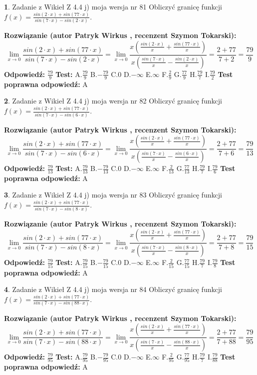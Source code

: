 \documentclass[12pt, a4paper]{article}
\theoremstyle{definition} %
\newtheorem{zad}{}
\newcommand{\zadStart}[1]{\begin{zad}#1\newline}
\newcommand{\zadStop}{\end{zad}}
\newcommand{\rozwStart}[2]{\noindent \textbf{Rozwiązanie (autor #1 , recenzent #2): }\newline}
\newcommand{\rozwStop}{\newline}
\newcommand{\odpStart}{\noindent \textbf{Odpowiedź:}\newline}
\newcommand{\odpStop}{\newline}
\newcommand{\testStart}{\noindent \textbf{Test:}\newline}
\newcommand{\testStop}{\newline}
\newcommand{\kluczStart}{\noindent \textbf{Test poprawna odpowiedź:}\newline}
\newcommand{\kluczStop}{\newline}
\begin{document}
\zadStart{Zadanie z Wikieł Z 4.4 j) moja wersja nr 81}
Obliczyć granicę funkcji $f(x)=\frac{sin(2\cdot x) +sin(77\cdot x)}{sin(7\cdot x) -sin(2\cdot x)}$.
\zadStop
\rozwStart{Patryk Wirkus}{Szymon Tokarski}
$$\lim\limits_{x\to 0}\frac{sin(2\cdot x) +sin(77\cdot x)}{sin(7\cdot x) -sin(2\cdot x)}=\lim\limits_{x\to 0}\frac{x(\frac{sin(2\cdot x)}{x}+\frac{sin(77\cdot x)}{x})}{x(\frac{sin(7\cdot x)}{x}-\frac{sin(2\cdot x)}{x})}=\frac{2+77}{7+2} = \frac{79}{9}$$
\rozwStop
\odpStart
$\frac{79}{9}$
\odpStop
\testStart
A.$\frac{79}{9}$
B.$-\frac{79}{9}$
C.$0$
D.$-\infty$
E.$\infty$
F.$\frac{2}{9}$
G.$\frac{77}{9}$
H.$\frac{79}{7}$
I.$\frac{79}{2}$
\testStop
\kluczStart
A
\kluczStop



\zadStart{Zadanie z Wikieł Z 4.4 j) moja wersja nr 82}
Obliczyć granicę funkcji $f(x)=\frac{sin(2\cdot x) +sin(77\cdot x)}{sin(7\cdot x) -sin(6\cdot x)}$.
\zadStop
\rozwStart{Patryk Wirkus}{Szymon Tokarski}
$$\lim\limits_{x\to 0}\frac{sin(2\cdot x) +sin(77\cdot x)}{sin(7\cdot x) -sin(6\cdot x)}=\lim\limits_{x\to 0}\frac{x(\frac{sin(2\cdot x)}{x}+\frac{sin(77\cdot x)}{x})}{x(\frac{sin(7\cdot x)}{x}-\frac{sin(6\cdot x)}{x})}=\frac{2+77}{7+6} = \frac{79}{13}$$
\rozwStop
\odpStart
$\frac{79}{13}$
\odpStop
\testStart
A.$\frac{79}{13}$
B.$-\frac{79}{13}$
C.$0$
D.$-\infty$
E.$\infty$
F.$\frac{2}{13}$
G.$\frac{77}{13}$
H.$\frac{79}{7}$
I.$\frac{79}{6}$
\testStop
\kluczStart
A
\kluczStop



\zadStart{Zadanie z Wikieł Z 4.4 j) moja wersja nr 83}
Obliczyć granicę funkcji $f(x)=\frac{sin(2\cdot x) +sin(77\cdot x)}{sin(7\cdot x) -sin(8\cdot x)}$.
\zadStop
\rozwStart{Patryk Wirkus}{Szymon Tokarski}
$$\lim\limits_{x\to 0}\frac{sin(2\cdot x) +sin(77\cdot x)}{sin(7\cdot x) -sin(8\cdot x)}=\lim\limits_{x\to 0}\frac{x(\frac{sin(2\cdot x)}{x}+\frac{sin(77\cdot x)}{x})}{x(\frac{sin(7\cdot x)}{x}-\frac{sin(8\cdot x)}{x})}=\frac{2+77}{7+8} = \frac{79}{15}$$
\rozwStop
\odpStart
$\frac{79}{15}$
\odpStop
\testStart
A.$\frac{79}{15}$
B.$-\frac{79}{15}$
C.$0$
D.$-\infty$
E.$\infty$
F.$\frac{2}{15}$
G.$\frac{77}{15}$
H.$\frac{79}{7}$
I.$\frac{79}{8}$
\testStop
\kluczStart
A
\kluczStop



\zadStart{Zadanie z Wikieł Z 4.4 j) moja wersja nr 84}
Obliczyć granicę funkcji $f(x)=\frac{sin(2\cdot x) +sin(77\cdot x)}{sin(7\cdot x) -sin(88\cdot x)}$.
\zadStop
\rozwStart{Patryk Wirkus}{Szymon Tokarski}
$$\lim\limits_{x\to 0}\frac{sin(2\cdot x) +sin(77\cdot x)}{sin(7\cdot x) -sin(88\cdot x)}=\lim\limits_{x\to 0}\frac{x(\frac{sin(2\cdot x)}{x}+\frac{sin(77\cdot x)}{x})}{x(\frac{sin(7\cdot x)}{x}-\frac{sin(88\cdot x)}{x})}=\frac{2+77}{7+88} = \frac{79}{95}$$
\rozwStop
\odpStart
$\frac{79}{95}$
\odpStop
\testStart
A.$\frac{79}{95}$
B.$-\frac{79}{95}$
C.$0$
D.$-\infty$
E.$\infty$
F.$\frac{2}{95}$
G.$\frac{77}{95}$
H.$\frac{79}{7}$
I.$\frac{79}{88}$
\testStop
\kluczStart
A
\kluczStop
\end{document}

